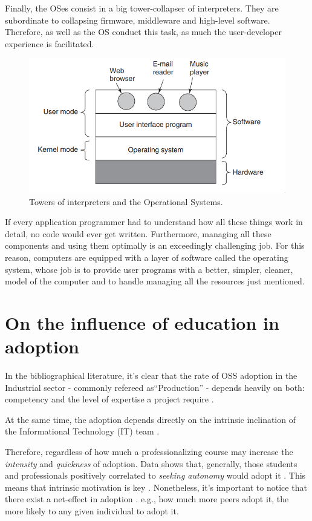 \documentclass[
12pt,				%
openright,			%
oneside,			%
a4paper,			%
brazil,				%
english,			  %
]{abntex2}
\begin{document}
Finally, the OSes consist in a big tower-collapser of
interpreters. They are subordinate to collapsing firmware, middleware
and high-level software. Therefore, as well as the OS conduct this task,
as much the user-developer experience is facilitated.

\begin{figure}[ht]
  \centering
 \caption{\label{fig:os} Towers of interpreters and the Operational Systems.}
  \includegraphics[width=0.5\linewidth]{tower-os.png}
\end{figure}

\begin{citacao}
If every application programmer had to understand how all these things work in detail, no code would ever
get written. Furthermore, managing all these components and using them optimally
is an exceedingly challenging job. For this reason, computers are equipped with a
layer of software called the operating system, whose job is to provide
user programs with a better, simpler, cleaner, model of the computer
and to handle managing all the resources just mentioned. \cite{tanenbaum2015modern}
\end{citacao}

\section{On the influence of education in adoption}

In the bibliographical literature, it's clear that the rate of OSS adoption in the Industrial sector - commonly refereed as``Production'' - depends heavily on both: competency and the level of expertise a project require \cite{li2013all,gallego2015open,spinellis2012organizational}.

At the same time, the adoption depends directly on the intrinsic inclination of the Informational Technology (IT) team \cite{racero2021can}. 

Therefore, regardless of how much a professionalizing course may increase the \textit{intensity} and \textit{quickness} of adoption. Data shows that, generally, those students and professionals positively correlated to \textit{seeking autonomy} would adopt it \cite{racero2020predicting}. This means that intrinsic motivation is key \cite{gallego2015open}. Nonetheless, it's important to notice that there exist a net-effect in adoption \cite{spinellis2012organizational}. e.g., how much more peers adopt it, the more likely to any given individual to adopt it.      
\end{document}
